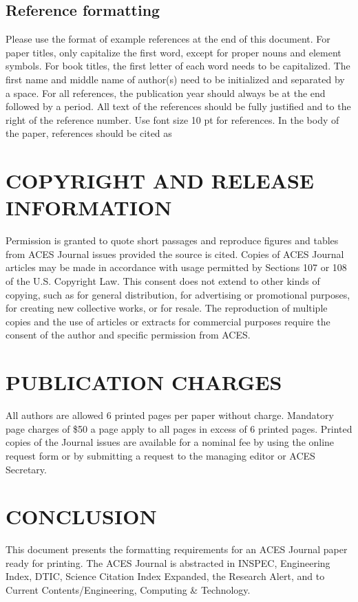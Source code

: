 \documentclass[letterpaper,twocolumn]{ACESJournal}
\newcommand{\red}[1]{{\color{red}#1}}
\begin{document}
\subsection{Reference formatting}
%
Please use the format of example references at the end of this document. For paper titles, only capitalize the first word, except for proper nouns and element symbols. For book titles, the first letter of each word needs to be capitalized. The first name and middle name of author(s) need to be initialized and separated by a space. \red{For all references, the publication year should always be at the end followed by a period. All text of the references should be fully justified and to the right of the reference number. Use font size 10 pt for references.} In the body of the paper, references should be cited as \cite{elsherbeni,1138693,opac-b1105789,4135853}
%
\section{COPYRIGHT AND RELEASE INFORMATION}
%
Permission is granted to quote short passages and reproduce figures and tables from ACES Journal issues provided the source is cited. Copies of ACES Journal articles may be made in accordance with usage permitted by Sections 107 or 108 of the U.S. Copyright Law. This consent does not extend to other kinds of copying, such as for general distribution, for advertising or promotional purposes, for creating new collective works, or for resale. The reproduction of multiple copies and the use of articles or extracts for commercial purposes require the consent of the author and specific permission from ACES.
%
\section{PUBLICATION CHARGES}
%
\red{All authors are allowed 6 printed pages per paper without charge. Mandatory page charges of \$50 a page apply to all pages in excess of 6 printed pages.} Printed copies of the Journal issues are available for a nominal fee by using the online request form or by submitting a request to the managing editor or ACES Secretary.
%
\section{CONCLUSION}
%
This document presents the formatting requirements for an ACES Journal paper ready for printing. The ACES Journal is abstracted in INSPEC, Engineering Index, DTIC, Science Citation Index Expanded, the Research Alert, and to Current Contents/Engineering, Computing \& Technology.
%
\end{document}
